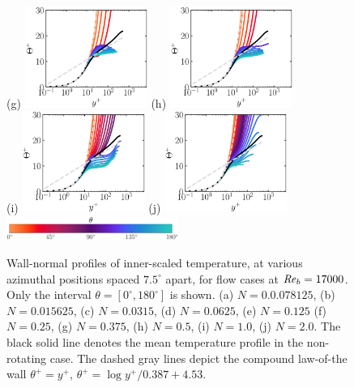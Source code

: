 \documentclass[lineno]{jfm}
\begin{document}
\begin{figure}
                (g) \includegraphics[width=4cm]{Figures/prof_ttplus_rotz0_roty0.1875.eps}
                (h) \includegraphics[width=4cm]{Figures/prof_ttplus_rotz0_roty0.25.eps} \\
                (i) \includegraphics[width=4cm]{Figures/prof_ttplus_rotz0_roty0.5.eps}
                (j) \includegraphics[width=4cm]{Figures/prof_ttplus_rotz0_roty1.0.eps} \\
                \includegraphics[width=0.5\textwidth]{Figures/theta_cmap.eps}
        \caption{
                Wall-normal profiles of
                inner-scaled temperature,
                at various azimuthal positions spaced
                $7.5^\circ$ apart,
                for flow cases at $\mbox{\textit{Re}}_b=17000$.
                Only the interval $\theta = [0^{\circ},180^{\circ}]$ is shown.
                (a) $N = 0.0.078125$,
                (b) $N = 0.015625$,
                (c) $N = 0.0315$,
                (d) $N = 0.0625$,
                (e) $N = 0.125$
                (f) $N = 0.25$,
                (g) $N = 0.375$,
                (h) $N = 0.5$,
                (i) $N = 1.0$,
                (j) $N = 2.0$.
                The black solid line denotes the mean temperature profile in the
                non-rotating case.
                The dashed gray lines depict the compound law-of-the wall
		$\theta^{+}=y^+$, $\theta^{+}=\log y^+/0.387 + 4.53$.
        }
                \label{fig:tplus}
        \end{figure}
\end{document}

